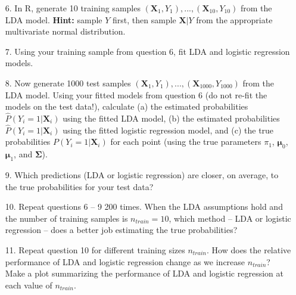 \documentclass[11pt]{article}
\begin{document}
\begin{enumerate}
\item[6.]  In R, generate 10 training samples $(\bm{X}_1, Y_1),...,(\bm{X}_{10}, Y_{10})$ from the LDA model. \textbf{Hint:} sample $Y$ first, then sample $\bm{X}|Y$ from the appropriate multivariate normal distribution.

\item[7.] Using your training sample from question 6, fit LDA and logistic regression models. 

\item[8.] Now generate 1000 test samples $(\bm{X}_1, Y_1),...,(\bm{X}_{1000}, Y_{1000})$ from the LDA model. Using your fitted models from question 6 (do not re-fit the models on the test data!), calculate (a) the estimated probabilities $\widehat{P}(Y_i = 1 | \bm{X}_i)$ using the fitted LDA model, (b) the estimated probabilities $\widehat{P}(Y_i = 1 | \bm{X}_i)$ using the fitted logistic regression model, and (c) the true probabilities $P(Y_i = 1 | \bm{X}_i)$ for each point (using the true parameters $\pi_1$, $\bm{\mu}_0$, $\bm{\mu}_1$, and $\bm{\Sigma}$).

\item[9.] Which predictions (LDA or logistic regression) are closer, on average, to the true probabilities for your test data?

\item[10.] Repeat questions 6 -- 9 200 times. When the LDA assumptions hold and the number of training samples is $n_{train} = 10$, which method -- LDA or logistic regression -- does a better job estimating the true probabilities?

\item[11.] Repeat question 10 for different training sizes $n_{train}$. How does the relative performance of LDA and logistic regression change as we increase $n_{train}$? Make a plot summarizing the performance of LDA and logistic regression at each value of $n_{train}$.
\end{enumerate}
\end{document}
